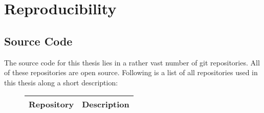 
\chapter{Reproducibility}

\section{Source Code}
The source code for this thesis lies in a rather vast number of git repositories.
All of these repositories are open source.
Following is a list of all repositories used in this thesis along a short description:
\captionsetup{labelformat=empty}
\begin{figure}[h]
	\begin{tabular}{ l | p{} }
		Repository 				& Description	 	\\\hline
		

\end{tabular}
\end{figure}
